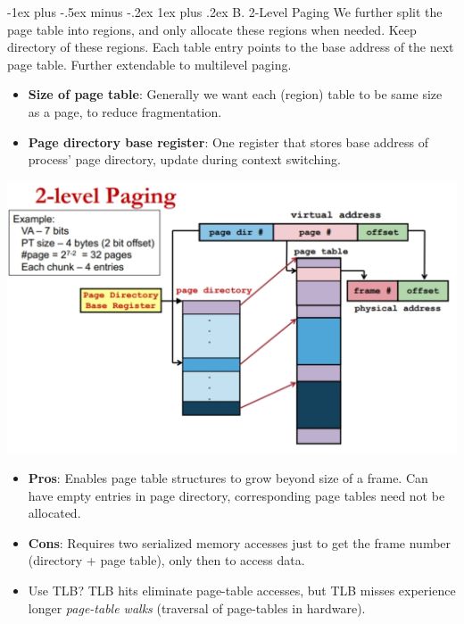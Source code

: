 \documentclass[10pt, landscape]{article}
\makeatletter
\renewcommand{\subsubsection}{\@startsection{subsubsection}{3}{0mm}%
                                {-1ex plus -.5ex minus -.2ex}%
                                {1ex plus .2ex}%
                                {\normalfont\small\bfseries}}
\makeatother
\begin{document}
\begin{multicols*}{3}
\subsubsection{B. 2-Level Paging}
We further split the page table into regions, and only allocate these regions when needed. Keep directory of these regions. Each table
entry points to the base address of the next page table. Further extendable to multilevel paging.
\begin{itemize}
\item \textbf{Size of page table}: Generally we want each (region) table to be same size as a page, to reduce fragmentation.
\item \textbf{Page directory base register}: One register that stores base address of process’ page directory, update during context switching.
\end{itemize}
\centerline{\includegraphics[width=1\linewidth]{2levelPaging}}
\begin{itemize}
\item \textbf{Pros}: Enables page table structures to grow beyond size of a frame. Can have empty entries in page directory, corresponding page tables need not be allocated.
\item \textbf{Cons}: Requires two serialized memory accesses just to get the frame number (directory + page table), only then to access data.
\item Use TLB? TLB hits eliminate page-table accesses, but TLB misses experience longer \textit{page-table walks} (traversal of page-tables in hardware).
\end{itemize}

\columnbreak


\end{multicols*}
\end{document}
